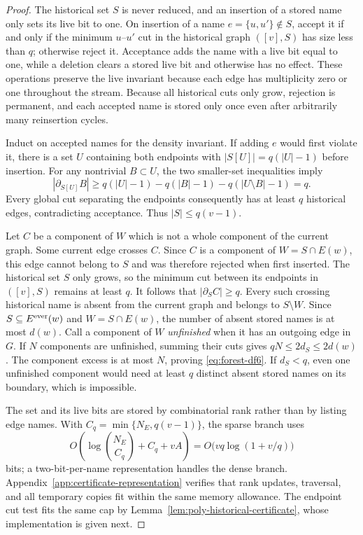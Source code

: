 \documentclass[11pt,letterpaper]{article}
\numberwithin{equation}{section}
\begin{document}
\begin{proof}
The historical set $S$ is never reduced, and an insertion of a stored name only sets its live bit to one.
On insertion of a name $e=\{u,u'\}\notin S$, accept it if and only if the minimum $u$--$u'$ cut in the historical graph $([v],S)$ has size less than $q$; otherwise reject it.
Acceptance adds the name with a live bit equal to one, while a deletion clears a stored live bit and otherwise has no effect.
These operations preserve the live invariant because each edge has multiplicity zero or one throughout the stream.
Because all historical cuts only grow, rejection is permanent, and each accepted name is stored only once even after arbitrarily many reinsertion cycles.

Induct on accepted names for the density invariant.
If adding $e$ would first violate it, there is a set $U$ containing both endpoints with $|S[U]|=q(|U|-1)$ before insertion.
For any nontrivial $B\subset U$, the two smaller-set inequalities imply
\[
 |\partial_{S[U]} B|\ge
 q(|U|-1)-q(|B|-1)-q(|U\setminus B|-1)=q.
\]
Every global cut separating the endpoints consequently has at least $q$ historical edges, contradicting acceptance.
Thus $|S|\le q(v-1)$.

Let $C$ be a component of $W$ which is not a whole component of the current graph.
Some current edge crosses $C$.
Since $C$ is a component of $W=S\cap E(w)$, this edge cannot belong to $S$ and was therefore rejected when first inserted.
The historical set $S$ only grows, so the minimum cut between its endpoints in $([v],S)$ remains at least $q$.
It follows that $|\partial_S C|\ge q$.
Every such crossing historical name is absent from the current graph and belongs to $S\setminus W$.
Since $S\subseteq E^{\rm ever}(w)$ and $W=S\cap E(w)$, the number of absent stored names is at most $d(w)$.
Call a component of $W$ \emph{unfinished} when it has an outgoing edge in $G$.
If $N$ components are unfinished, summing their cuts gives $qN\le2d_S\le2d(w)$.
The component excess is at most $N$, proving \eqref{eq:forest-df6}.
If $d_S<q$, even one unfinished component would need at least $q$ distinct absent stored names on its boundary, which is impossible.

The set and its live bits are stored by combinatorial rank rather than by listing edge names.
With $C_q=\min\{N_E,q(v-1)\}$, the sparse branch uses
\[
 O\!\left(\log\binom{N_E}{C_q}+C_q+vA\right)
   =O\bigl(vq\log(1+v/q)\bigr)
\]
bits; a two-bit-per-name representation handles the dense branch.
Appendix~\ref{app:certificate-representation} verifies that rank updates, traversal, and all temporary copies fit within the same memory allowance.
The endpoint cut test fits the same cap by Lemma~\ref{lem:poly-historical-certificate}, whose implementation is given next.
\end{proof}
\end{document}
